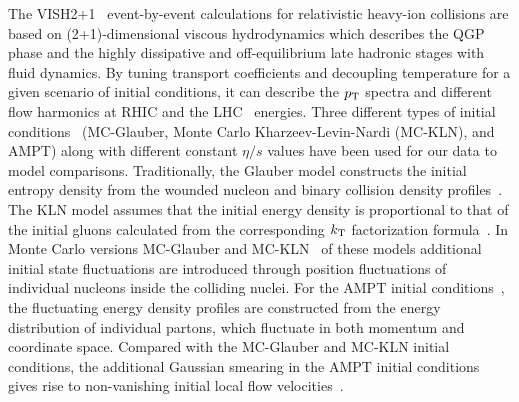 The VISH2+1~\cite{Shen:2010uy,Shen:2014vra} event-by-event calculations for relativistic heavy-ion collisions are based on (2+1)-dimensional viscous hydrodynamics which describes the QGP phase and the highly dissipative and off-equilibrium late hadronic stages with fluid dynamics. By tuning transport coefficients and decoupling temperature for a given scenario of initial conditions, it can describe the $p_{\rm T}$ spectra and different flow harmonics at RHIC and the LHC~\cite{Qiu:2011hf, Shen:2010uy, Shen:2011eg, Bhalerao:2015iya} energies.
Three different types of initial conditions~\cite{Zhu:2016puf} ({MC-Glauber}, Monte Carlo Kharzeev-Levin-Nardi ({MC-KLN}), and {AMPT}) along with different constant $\eta/s$ values have been used for our data to model comparisons.
Traditionally, the Glauber model constructs the initial entropy density from the wounded nucleon and binary collision density profiles~\cite{Kolb:2000sd}. The {KLN} model assumes that the initial energy density is proportional to that of the initial gluons calculated from the corresponding $k_{\rm T}$ factorization formula~\cite{Kharzeev:2000ph}.
In Monte Carlo versions {MC-Glauber} and {MC-KLN}~\cite{Miller:2007ri,Drescher:2006ca,Hirano:2009ah} of these models additional initial state fluctuations are introduced through position fluctuations of individual nucleons inside the colliding nuclei. For the {AMPT} initial conditions~\cite{Bhalerao:2015iya,Pang:2012he,Xu:2016hmp}, the fluctuating energy density profiles are constructed from the energy distribution of individual partons, which fluctuate in both momentum and coordinate space. Compared with the {MC-Glauber} and {MC-KLN} initial conditions, the additional Gaussian smearing in the {AMPT} initial conditions gives rise to non-vanishing initial local flow velocities~\cite{Pang:2012he}. 

